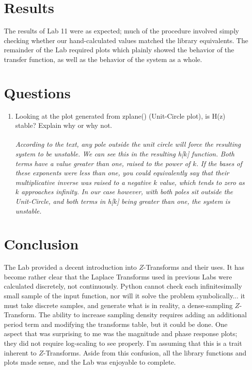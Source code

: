 \documentclass[12pt]{report}
\begin{document}
\section{Results}
The results of Lab 11 were as expected; much of the procedure involved simply checking whether our hand-calculated values matched the library equivalents. The remainder of the Lab required plots which plainly showed the behavior of the transfer function, as well as the behavior of the system as a whole.

\section{Questions}
\begin{enumerate}
    \item{Looking at the plot generated from zplane() (Unit-Circle plot), is H(z) stable? Explain why or why not.}\\~\\
    \textit{According to the text, any pole outside the unit circle will force the resulting system to be unstable. We can see this in the resulting h[$k$] function. Both terms have a value greater than one, raised to the power of $k$. If the bases of these exponents were less than one, you could equivalently say that their multiplicative inverse was raised to a negative $k$ value, which tends to zero as $k$ approaches infinity. In our case however, with both poles sit outside the Unit-Circle, and both terms in h[$k$] being greater than one, the system is unstable.}\\
\end{enumerate}

\section{Conclusion}
The Lab provided a decent introduction into $Z$-Transforms and their uses. It has become rather clear that the Laplace Transforms used in previous Labs were calculated discretely, not continuously. Python cannot check each infinitesimally small sample of the input function, nor will it solve the problem symbolically... it must take discrete samples, and generate what is in reality, a dense-sampling $Z$-Transform. The ability to increase sampling density requires adding an additional period term and modifying the transforms table, but it could be done. One aspect that was surprising to me was the magnitude and phase response plots; they did not require log-scaling to see properly. I'm assuming that this is a trait inherent to $Z$-Transforms. Aside from this confusion, all the library functions and plots made sense, and the Lab was enjoyable to complete.
\end{document}
